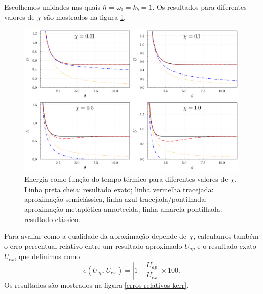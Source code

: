 \documentclass[
	12pt,
	oneside,			%
	a4paper,			%
	english,			%
	brazil				%
	]{abntex2}
\theoremstyle{definition}
\begin{document}
Escolhemos unidades nas quais $\hbar = \omega_0 = k_b = 1$. Os resultados para diferentes valores de $\chi$ são mostrados na figura \ref{energias kerr}.

\begin{figure}[H]
    \includegraphics[width=\textwidth]{Imagens/energias_kerr.png}
    \centering
    \caption{Energia como função do tempo térmico para diferentes valores de $\chi$. Linha preta cheia: resultado exato; linha vermelha tracejada: aproximação semiclássica, linha azul tracejada/pontilhada: aproximação metaplética amortecida; linha amarela pontilhada: resultado clássico.}
    \label{energias kerr}
\end{figure}

Para avaliar como a qualidade da aproximação depende de $\chi$, calculamos também o erro percentual relativo entre um resultado aproximado $U_{ap}$ e o resultado exato $U_{ex}$, que definimos como
\begin{equation}
    e\left( U_{ap}, U_{ex} \right) = \left| 1- \frac{ U_{ap}}{U_{ex}} \right| \times 100.
\end{equation}
Os resultados são mostrados na figura \ref{erros relativos kerr}.
\end{document}
